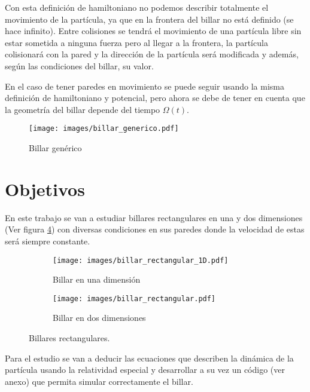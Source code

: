 Con esta definición de hamiltoniano no podemos describir totalmente el movimiento de la partícula, ya que en la frontera del billar no está definido (se hace infinito). Entre colisiones se tendrá el movimiento de una partícula libre sin estar sometida a ninguna fuerza pero al llegar a la frontera, la partícula colisionará con la pared y la dirección de la partícula será modificada y además, según las condiciones del billar, su valor. 

\vspace{3mm}

En el caso de tener paredes en movimiento se puede seguir usando la misma definición de hamiltoniano y potencial, pero ahora se debe de tener en cuenta que la geometría del billar depende del tiempo \( \Omega(t) \).

\begin{figure}[H]
    \centering
    \texttt{[image: images/billar\_generico.pdf]}
    \caption{Billar genérico}
    \label{fig:bilar_generico}
\end{figure}


\section{Objetivos}

En este trabajo se van a estudiar billares rectangulares en una y dos dimensiones (Ver figura \ref{fig:billar_rectangular}) con diversas condiciones en sus paredes donde la velocidad de estas será siempre constante.

\begin{figure}[H]
    \centering
    \begin{subfigure}[b]{0.5\textwidth}
        \centering
        \texttt{[image: images/billar\_rectangular\_1D.pdf]}
        \caption{Billar en una dimensión}
        \label{fig:billar_rectangular_1D}
    \end{subfigure}
    \hfill
    \begin{subfigure}[b]{0.49\textwidth}
        \centering
        \texttt{[image: images/billar\_rectangular.pdf]}
        \caption{Billar en dos dimensiones}
        \label{fig:billar_rectangular_2D}
    \end{subfigure}
    \caption{Billares rectangulares.}
        \label{fig:billar_rectangular}
\end{figure}

Para el estudio se van a deducir las ecuaciones que describen la dinámica de la partícula usando la relatividad especial y desarrollar a su vez un código (ver anexo) que permita simular correctamente el billar.

